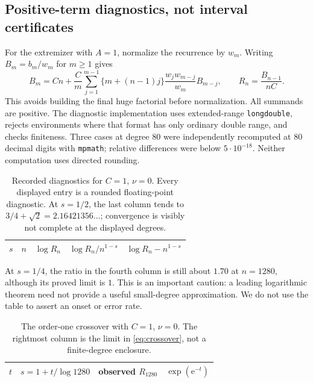 \documentclass[11pt,a4paper]{article}
\theoremstyle{definition}
\theoremstyle{remark}
\newcommand{\ee}{\mathrm e}
\numberwithin{equation}{section}
\begin{document}
\subsection{Positive-term diagnostics, not interval certificates}
For the extremizer with $A=1$, normalize the recurrence by $w_m$.
Writing $B_m=b_m/w_m$ for $m\ge1$ gives
\begin{equation}
 B_m=Cn+\frac Cm\sum_{j=1}^{m-1}\{m+(n-1)j\}
              \frac{w_jw_{m-j}}{w_m}B_{m-j},\qquad
 R_n=\frac{B_{n-1}}{nC}.
 \label{eq:scaledalgorithm}
\end{equation}
This avoids building the final huge factorial before normalization.
All summands are positive. The diagnostic implementation uses
extended-range \texttt{longdouble}, rejects environments where that
format has only ordinary double range, and checks finiteness. Three
cases at degree $80$ were independently recomputed at $80$ decimal digits
with \texttt{mpmath}; relative differences were below $5\cdot10^{-18}$.
Neither computation uses directed rounding.

\begin{table}[htbp]
\centering\small
\begin{tabular}{rrrrr}
\toprule
$s$ & $n$ & $\log R_n$ & $\log R_n/n^{1-s}$ & $\log R_n-n^{1-s}$\\
\midrule

\end{tabular}
\caption{Recorded diagnostics for $C=1$, $\nu=0$. Every displayed entry is a rounded floating-point diagnostic. At $s=1/2$, the last column tends to $3/4+\sqrt2=2.16421356\ldots$; convergence is visibly not complete at the displayed degrees.}
\label{tab:diagnostics}
\end{table}

At $s=1/4$, the ratio in the fourth column is still about $1.70$ at
$n=1280$, although its proved limit is $1$. This is an important caution:
a leading logarithmic theorem need not provide a useful small-degree
approximation. We do not use the table to assert an onset or error rate.

\begin{table}[htbp]
\centering\small
\begin{tabular}{rrrr}
\toprule
$t$ & $s=1+t/\log1280$ & observed $R_{1280}$ & $\exp(\ee^{-t})$\\
\midrule

\end{tabular}
\caption{The order-one crossover with $C=1$, $\nu=0$. The rightmost column is the limit in \eqref{eq:crossover}, not a finite-degree enclosure.}
\end{table}
\end{document}
